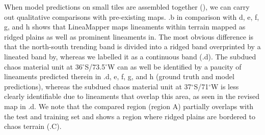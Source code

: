
When model predictions on small tiles are assembled together (), we can carry out qualitative comparisons with pre-existing maps. .b in comparison with d, e, f, g, and h shows that LineaMapper maps lineaments within terrain mapped as ridged plains as well as prominent lineaments in. The most obvious difference is that the north-south trending band is divided into a ridged band overprinted by a lineated band by, whereas we labelled it as a continuous band (.d). 
The subdued chaos material unit at 36$^{\circ}$S/73.5$^{\circ}$W can as well be identified by a paucity of lineaments predicted therein in .d, e, f, g, and h (ground truth and model predictions), whereas the subdued chaos material unit at 37$^{\circ}$S/71$^{\circ}$W is less clearly identifiable due to lineaments that overlap this area, as seen in the revised map in .d.
We note that the compared region (region A) partially overlaps with the test and training set and shows a region where ridged plains are bordered to chaos terrain (.C).

